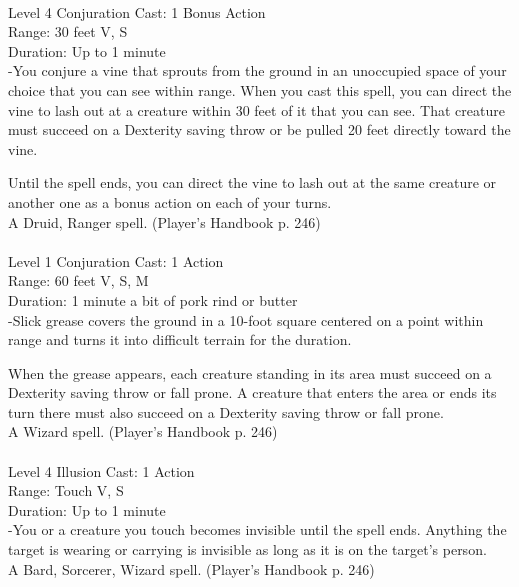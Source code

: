 \documentclass[10pt,twocolumn]{report}
\begin{document}
 \\
Level 4 \quad Conjuration \quad Cast: 1 Bonus Action\\
Range: 30 feet \quad V, S\\
Duration: Up to 1 minute \quad \\
-You conjure a vine that sprouts from the ground in an unoccupied space of your choice that you can see within range. When you cast this spell, you can direct the vine to lash out at a creature within 30 feet of it that you can see. That creature must succeed on a Dexterity saving throw or be pulled 20 feet directly toward the vine.

Until the spell ends, you can direct the vine to lash out at the same creature or another one as a bonus action on each of your turns.\\
A Druid, Ranger spell. (Player's Handbook p. 246) \\


 \\
Level 1 \quad Conjuration \quad Cast: 1 Action\\
Range: 60 feet \quad V, S, M\\
Duration: 1 minute \quad a bit of pork rind or butter\\
-Slick grease covers the ground in a 10-foot square centered on a point within range and turns it into difficult terrain for the duration.

When the grease appears, each creature standing in its area must succeed on a Dexterity saving throw or fall prone. A creature that enters the area or ends its turn there must also succeed on a Dexterity saving throw or fall prone.\\
A Wizard spell. (Player's Handbook p. 246) \\


 \\
Level 4 \quad Illusion \quad Cast: 1 Action\\
Range: Touch \quad V, S\\
Duration: Up to 1 minute \quad \\
-You or a creature you touch becomes invisible until the spell ends. Anything the target is wearing or carrying is invisible as long as it is on the target’s person.\\
A Bard, Sorcerer, Wizard spell. (Player's Handbook p. 246) \\
\end{document}
